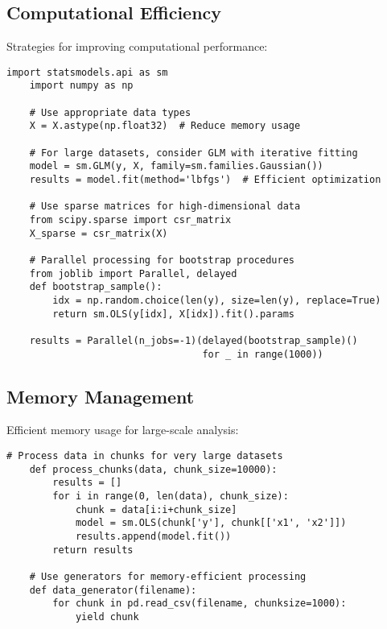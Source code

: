 \subsection{Computational Efficiency}
\label{subsec:computational}

Strategies for improving computational performance:

\begin{lstlisting}[language=MyPython, caption={Performance Optimization}, label={lst:optimization}]
	import statsmodels.api as sm
	import numpy as np
	
	# Use appropriate data types
	X = X.astype(np.float32)  # Reduce memory usage
	
	# For large datasets, consider GLM with iterative fitting
	model = sm.GLM(y, X, family=sm.families.Gaussian())
	results = model.fit(method='lbfgs')  # Efficient optimization
	
	# Use sparse matrices for high-dimensional data
	from scipy.sparse import csr_matrix
	X_sparse = csr_matrix(X)
	
	# Parallel processing for bootstrap procedures
	from joblib import Parallel, delayed
	def bootstrap_sample():
	    idx = np.random.choice(len(y), size=len(y), replace=True)
	    return sm.OLS(y[idx], X[idx]).fit().params
	
	results = Parallel(n_jobs=-1)(delayed(bootstrap_sample)() 
	                              for _ in range(1000))
\end{lstlisting}

\subsection{Memory Management}
\label{subsec:memory}

Efficient memory usage for large-scale analysis:

\begin{lstlisting}[language=MyPython, caption={Memory Management}, label={lst:memory}]
	# Process data in chunks for very large datasets
	def process_chunks(data, chunk_size=10000):
	    results = []
	    for i in range(0, len(data), chunk_size):
	        chunk = data[i:i+chunk_size]
	        model = sm.OLS(chunk['y'], chunk[['x1', 'x2']])
	        results.append(model.fit())
	    return results
	
	# Use generators for memory-efficient processing
	def data_generator(filename):
	    for chunk in pd.read_csv(filename, chunksize=1000):
	        yield chunk
\end{lstlisting}


